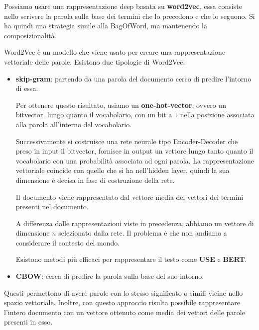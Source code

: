 Possiamo usare una rappresentazione deep basata su \textbf{word2vec}, essa consiste
nello scrivere la parola sulla base dei termini che lo precedono e che lo seguono.
Si ha quindi una strategia simile alla BagOfWord, ma mantenendo la composizionalità.

Word2Vec è un modello che viene usato per creare una rappresentazione vettoriale
delle parole. Esistono due tipologie di Word2Vec:
\begin{itemize}
      \item \textbf{skip-gram}: partendo da una parola del documento cerco di
            predire l'intorno di essa.

            Per ottenere questo risultato, usiamo un \textbf{one-hot-vector},
            ovvero un bitvector, lungo quanto il vocabolario, con un bit a $1$
            nella posizione associata alla parola all'interno del vocabolario.

            Successivamente si costruisce una rete neurale tipo Encoder-Decoder
            che preso in input il bitvector, fornisce in output un vettore
            lungo tanto quanto il vocabolario con una probabilità associata ad
            ogni parola. La rappresentazione vettoriale coincide con quello che
            si ha nell'hidden layer, quindi la sua dimensione è decisa in fase di
            costruzione della rete.

            Il documento viene rappresentato dal vettore media dei vettori dei
            termini presenti nel documento.

            A differenza dalle rappresentazioni viste in precedenza, abbiamo un
            vettore di dimensione $n$ selezionato dalla rete. Il problema è che
            non andiamo a considerare il contesto del mondo.

            Esistono metodi più efficaci per rappresentare il testo come
            \textbf{USE} e \textbf{BERT}.
      \item \textbf{CBOW}: cerca di predire la parola sulla base del suo intorno.
\end{itemize}
Questi permettono di avere parole con lo stesso significato o simili vicine nello
spazio vettoriale. Inoltre, con questo approccio risulta possibile rappresentare
l'intero documento con un vettore ottenuto come media dei vettori delle parole
presenti in esso.

